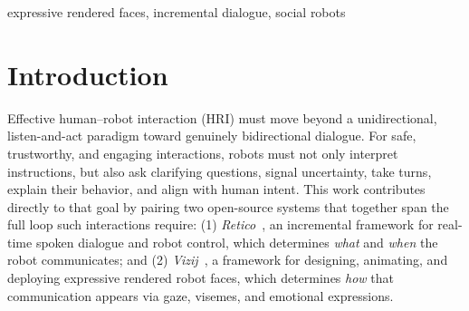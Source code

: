 \documentclass[conference]{IEEEtran}
\begin{document}
\maketitle



\begin{abstract}
Effective human--robot interaction is both multimodal and incremental, yet these properties are usually pursued separately: expressive face systems render gaze and emotion with no real-time signal to drive them, while incremental dialogue systems expose no expressive output. We present a system architecture integrating \textit{Retico}~\cite{michael2020retico}, an incremental framework for real-time spoken dialogue and robot control, with \textit{Vizij}~\cite{elbeleidy2026vizij}, an open-source framework for designing, animating, and deploying expressive rendered robot faces. Recent systems generate robot facial expression from language models, but do so from completed dialogue state; the architecture described here renders revisable partial signals mid-utterance. The proposed modular architecture provides a starting point for future work to replace and evaluate individual software behavior modules or module combinations.
\end{abstract}



\begin{IEEEkeywords}
expressive rendered faces, incremental dialogue, social robots
\end{IEEEkeywords}



\section{Introduction}
Effective human–robot interaction (HRI) must move beyond a unidirectional, listen-and-act paradigm toward genuinely bidirectional dialogue. For safe, trustworthy, and engaging interactions, robots must not only interpret instructions, but also ask clarifying questions, signal uncertainty, take turns, explain their behavior, and align with human intent. This work contributes directly to that goal by pairing two open-source systems that together span the full loop such interactions require: (1) \textit{Retico}~\cite{michael2020retico}, an incremental framework for real-time spoken dialogue and robot control, which determines \textit{what} and \textit{when} the robot communicates; and (2) \textit{Vizij}~\cite{elbeleidy2026vizij,elbeleidy2026tutorial}, a framework for designing, animating, and deploying expressive rendered robot faces, which determines \textit{how} that communication appears via gaze, visemes, and emotional expressions.
\end{document}
